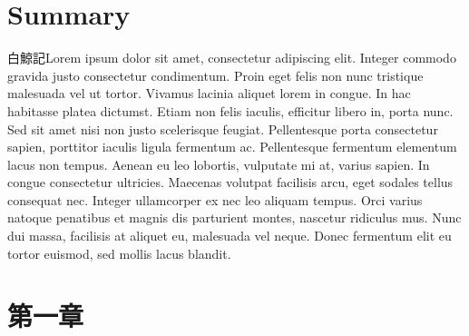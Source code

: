 \documentclass[
  letterpaper,
  oneside,
  open=any]{scrbook}
\renewcommand*\contentsname{Table of contents}
\newcommand\contentsname{Table of contents}
\begin{document}
\begin{frontmatter}
\begin{titlepage}
\begin{minipage}[b][\textheight][s]{\minipagewidth}
\titleblock

\authorblock

\affiliationblock

\vfill

\logoblock

\footerblock
\par

\end{minipage}
\clearpage
\restoregeometry
\end{titlepage}
\setcounter{page}{1}
\end{frontmatter}


\renewcommand*\contentsname{Table of contents}
{
\setcounter{tocdepth}{1}
\tableofcontents
}
\listoffigures
\listoftables

\mainmatter
{}

\chapter*{Summary}\label{summary}


白鯨記Lorem ipsum dolor sit amet, consectetur adipiscing elit. Integer
commodo gravida justo consectetur condimentum. Proin eget felis non nunc
tristique malesuada vel ut tortor. Vivamus lacinia aliquet lorem in
congue. In hac habitasse platea dictumst. Etiam non felis iaculis,
efficitur libero in, porta nunc. Sed sit amet nisi non justo scelerisque
feugiat. Pellentesque porta consectetur sapien, porttitor iaculis ligula
fermentum ac. Pellentesque fermentum elementum lacus non tempus. Aenean
eu leo lobortis, vulputate mi at, varius sapien. In congue consectetur
ultricies. Maecenas volutpat facilisis arcu, eget sodales tellus
consequat nec. Integer ullamcorper ex nec leo aliquam tempus. Orci
varius natoque penatibus et magnis dis parturient montes, nascetur
ridiculus mus. Nunc dui massa, facilisis at aliquet eu, malesuada vel
neque. Donec fermentum elit eu tortor euismod, sed mollis lacus blandit.


\chapter{第一章}\label{ux7b2cux4e00ux7ae0}
\end{document}

